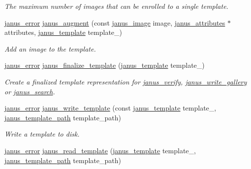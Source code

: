 \begin{DoxyCompactItemize}
\begin{DoxyCompactList}\small\item\em The maximum number of images that can be enrolled to a single template. \end{DoxyCompactList}\item 
\hyperlink{group__janus_ga1b275e4dade484951b366f785597b8f6}{janus\+\_\+error} \hyperlink{group__janus_gab3a757ffae4d2c4f604543a71ae06399}{janus\+\_\+augment} (const \hyperlink{structjanus__image}{janus\+\_\+image} image, \hyperlink{structjanus__attributes}{janus\+\_\+attributes} $\ast$attributes, \hyperlink{group__janus_gaabac6b357615bbd03a082c714190e2d0}{janus\+\_\+template} template\+\_\+)
\begin{DoxyCompactList}\small\item\em Add an image to the template. \end{DoxyCompactList}\item 
\hyperlink{group__janus_ga1b275e4dade484951b366f785597b8f6}{janus\+\_\+error} \hyperlink{group__janus_ga8866f19be5375a9139ce8a20b9af45b2}{janus\+\_\+finalize\+\_\+template} (\hyperlink{group__janus_gaabac6b357615bbd03a082c714190e2d0}{janus\+\_\+template} template\+\_\+)
\begin{DoxyCompactList}\small\item\em Create a finalized template representation for \hyperlink{group__janus_gac59b09b7014e19ad2c270f44da9f8e83}{janus\+\_\+verify}, \hyperlink{group__janus_ga874a3668ca302fbff98e0df4cfa1a31c}{janus\+\_\+write\+\_\+gallery} or \hyperlink{group__janus_ga3ad534c34ae38082eb49ce8457545653}{janus\+\_\+search}. \end{DoxyCompactList}\item 
\hyperlink{group__janus_ga1b275e4dade484951b366f785597b8f6}{janus\+\_\+error} \hyperlink{group__janus_gaca62ac60aaa785c0a9134d980d1cb507}{janus\+\_\+write\+\_\+template} (const \hyperlink{group__janus_gaabac6b357615bbd03a082c714190e2d0}{janus\+\_\+template} template\+\_\+, \hyperlink{group__janus_gad1ec012594c24085ba7110ad96a2db22}{janus\+\_\+template\+\_\+path} template\+\_\+path)
\begin{DoxyCompactList}\small\item\em Write a template to disk. \end{DoxyCompactList}\item 
\hyperlink{group__janus_ga1b275e4dade484951b366f785597b8f6}{janus\+\_\+error} \hyperlink{group__janus_ga814335abf8d450912b1f99fadc15b7aa}{janus\+\_\+read\+\_\+template} (\hyperlink{group__janus_gaabac6b357615bbd03a082c714190e2d0}{janus\+\_\+template} template\+\_\+, \hyperlink{group__janus_gad1ec012594c24085ba7110ad96a2db22}{janus\+\_\+template\+\_\+path} template\+\_\+path)

\end{DoxyCompactItemize}
